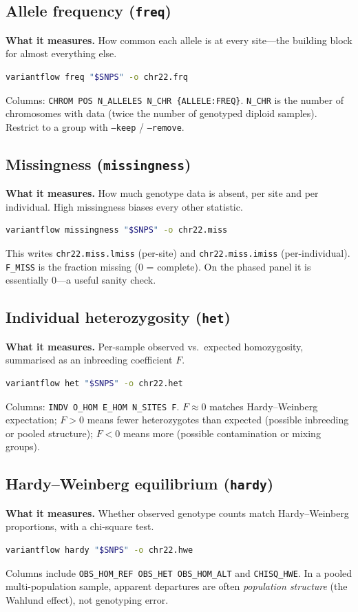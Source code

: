 \documentclass[11pt]{article}
\begin{document}
\subsection{Allele frequency (\texttt{freq})}
\textbf{What it measures.} How common each allele is at every site---the building
block for almost everything else.
\begin{lstlisting}[language=bash]
variantflow freq "$SNPS" -o chr22.frq
\end{lstlisting}
Columns: \texttt{CHROM POS N\_ALLELES N\_CHR \{ALLELE:FREQ\}}. \texttt{N\_CHR} is
the number of chromosomes with data (twice the number of genotyped diploid
samples). Restrict to a group with \texttt{--keep} / \texttt{--remove}.

\subsection{Missingness (\texttt{missingness})}
\textbf{What it measures.} How much genotype data is absent, per site and per
individual. High missingness biases every other statistic.
\begin{lstlisting}[language=bash]
variantflow missingness "$SNPS" -o chr22.miss
\end{lstlisting}
This writes \texttt{chr22.miss.lmiss} (per-site) and \texttt{chr22.miss.imiss}
(per-individual). \texttt{F\_MISS} is the fraction missing (0 = complete). On the
phased panel it is essentially 0---a useful sanity check.

\subsection{Individual heterozygosity (\texttt{het})}
\textbf{What it measures.} Per-sample observed vs.\ expected homozygosity,
summarised as an inbreeding coefficient $F$.
\begin{lstlisting}[language=bash]
variantflow het "$SNPS" -o chr22.het
\end{lstlisting}
Columns: \texttt{INDV O\_HOM E\_HOM N\_SITES F}. $F\approx 0$ matches
Hardy--Weinberg expectation; $F>0$ means fewer heterozygotes than expected
(possible inbreeding or pooled structure); $F<0$ means more (possible
contamination or mixing groups).

\subsection{Hardy--Weinberg equilibrium (\texttt{hardy})}
\textbf{What it measures.} Whether observed genotype counts match Hardy--Weinberg
proportions, with a chi-square test.
\begin{lstlisting}[language=bash]
variantflow hardy "$SNPS" -o chr22.hwe
\end{lstlisting}
Columns include \texttt{OBS\_HOM\_REF OBS\_HET OBS\_HOM\_ALT} and
\texttt{CHISQ\_HWE}. In a pooled multi-population sample, apparent departures are
often \emph{population structure} (the Wahlund effect), not genotyping error.
\end{document}

